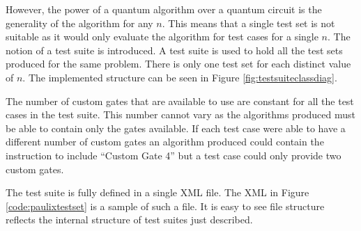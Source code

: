 However, the power of a quantum algorithm over a quantum circuit is the generality of the algorithm for any $n$.
This means that a single test set is not suitable as it would only evaluate the algorithm for test cases for a single $n$.
The notion of a test suite is introduced.
A test suite is used to hold all the test sets produced for the same problem.
There is only one test set for each distinct value of $n$.
The implemented structure can be seen in Figure \ref{fig:testsuiteclassdiag}.

The number of custom gates that are available to use are constant for all the test cases in the test suite.
This number cannot vary as the algorithms produced must be able to contain only the gates available.
If each test case were able to have a different number of custom gates an algorithm produced could contain the instruction to include ``Custom Gate 4'' but a test case could only provide two custom gates.

The test suite is fully defined in a single XML file.
The XML in Figure \ref{code:paulixtestset} is a sample of such a file.
It is easy to see file structure reflects the internal structure of test suites just described.

